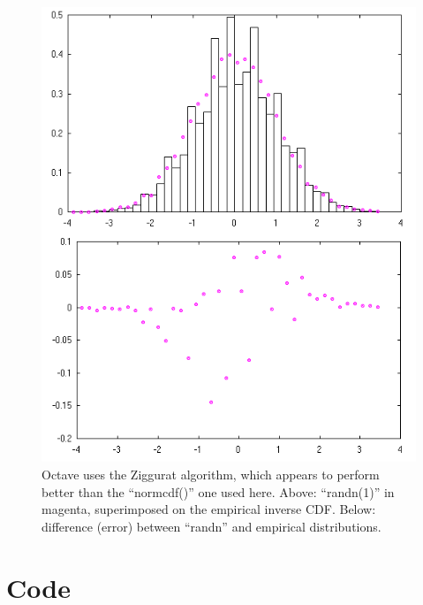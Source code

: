 \documentclass[letterpaper]{article}
\begin{document}
\begin{figure}[ht]
  \centering
  \includegraphics[width=\columnwidth]{2015-11-11_compare_normal.png}
  \caption{\label{fig:cmpNorm} Octave uses the Ziggurat algorithm, which appears
    to perform better than the ``normcdf()'' one used here.  Above: ``randn(1)''
    in magenta, superimposed on the empirical inverse CDF.  Below: difference
    (error) between ``randn'' and empirical distributions.}
\end{figure}

\restoregeometry

\clearpage


\section{Code}
\label{sec:code}



\restoregeometry
\end{document}
